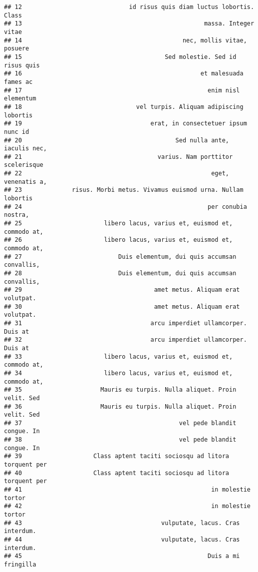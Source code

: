 \documentclass[
]{article}
\begin{document}
\begin{verbatim}
## 12                              id risus quis diam luctus lobortis. Class
## 13                                                   massa. Integer vitae
## 14                                             nec, mollis vitae, posuere
## 15                                        Sed molestie. Sed id risus quis
## 16                                                  et malesuada fames ac
## 17                                                    enim nisl elementum
## 18                                vel turpis. Aliquam adipiscing lobortis
## 19                                    erat, in consectetuer ipsum nunc id
## 20                                           Sed nulla ante, iaculis nec,
## 21                                      varius. Nam porttitor scelerisque
## 22                                                     eget, venenatis a,
## 23              risus. Morbi metus. Vivamus euismod urna. Nullam lobortis
## 24                                                    per conubia nostra,
## 25                       libero lacus, varius et, euismod et, commodo at,
## 26                       libero lacus, varius et, euismod et, commodo at,
## 27                           Duis elementum, dui quis accumsan convallis,
## 28                           Duis elementum, dui quis accumsan convallis,
## 29                                     amet metus. Aliquam erat volutpat.
## 30                                     amet metus. Aliquam erat volutpat.
## 31                                    arcu imperdiet ullamcorper. Duis at
## 32                                    arcu imperdiet ullamcorper. Duis at
## 33                       libero lacus, varius et, euismod et, commodo at,
## 34                       libero lacus, varius et, euismod et, commodo at,
## 35                      Mauris eu turpis. Nulla aliquet. Proin velit. Sed
## 36                      Mauris eu turpis. Nulla aliquet. Proin velit. Sed
## 37                                            vel pede blandit congue. In
## 38                                            vel pede blandit congue. In
## 39                    Class aptent taciti sociosqu ad litora torquent per
## 40                    Class aptent taciti sociosqu ad litora torquent per
## 41                                                     in molestie tortor
## 42                                                     in molestie tortor
## 43                                       vulputate, lacus. Cras interdum.
## 44                                       vulputate, lacus. Cras interdum.
## 45                                                    Duis a mi fringilla

\end{verbatim}
\end{document}
